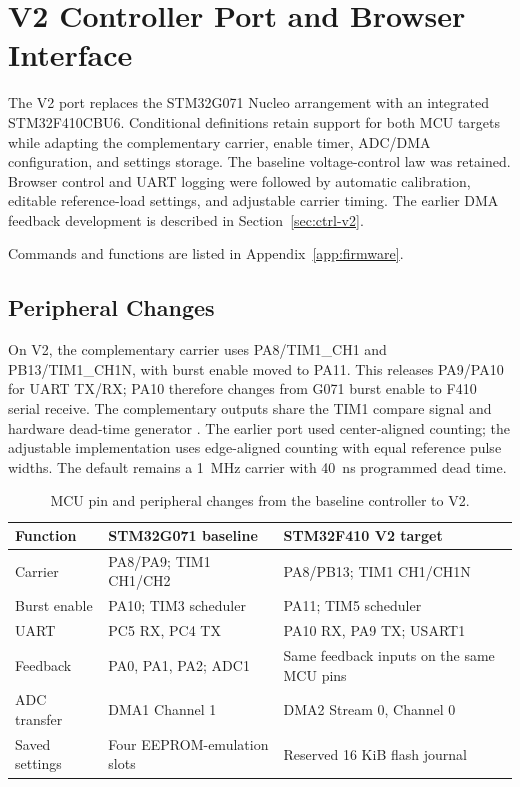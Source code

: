 \section{V2 Controller Port and Browser Interface}
\label{sec:ctrl-pwr2-port}

The V2 port replaces the STM32G071 Nucleo arrangement with an integrated STM32F410CBU6. Conditional definitions retain support for both MCU targets while adapting the complementary carrier, enable timer, ADC/DMA configuration, and settings storage. The baseline voltage-control law was retained. Browser control and UART logging were followed by automatic calibration, editable reference-load settings, and adjustable carrier timing. The earlier DMA feedback development is described in Section~\ref{sec:ctrl-v2}.

Commands and functions are listed in Appendix~\ref{app:firmware}.

\subsection{Peripheral Changes}

On V2, the complementary carrier uses PA8/TIM1\_CH1 and PB13/TIM1\_CH1N, with burst enable moved to PA11. This releases PA9/PA10 for UART TX/RX; PA10 therefore changes from G071 burst enable to F410 serial receive. The complementary outputs share the TIM1 compare signal and hardware dead-time generator \cite{ststm32f410ds,ststm32f410rm}. The earlier port used center-aligned counting; the adjustable implementation uses edge-aligned counting with equal reference pulse widths. The default remains a \SI{1}{\mega\hertz} carrier with \SI{40}{\nano\second} programmed dead time.

\begin{table}[htbp]
\centering
\caption{MCU pin and peripheral changes from the baseline controller to V2.}
\label{tab:ctrl-pwr2-port}
\small
\begin{tabularx}{\textwidth}{@{}L{0.23\textwidth}L{0.31\textwidth}Y@{}}
\toprule
Function & STM32G071 baseline & STM32F410 V2 target\\
\midrule
Carrier & PA8/PA9; TIM1 CH1/CH2 & PA8/PB13; TIM1 CH1/CH1N\\
Burst enable & PA10; TIM3 scheduler & PA11; TIM5 scheduler\\
UART & PC5 RX, PC4 TX & PA10 RX, PA9 TX; USART1\\
Feedback & PA0, PA1, PA2; ADC1 & Same feedback inputs on the same MCU pins\\
ADC transfer & DMA1 Channel 1 & DMA2 Stream 0, Channel 0\\
Saved settings & Four EEPROM-emulation slots & Reserved 16 KiB flash journal\\
\bottomrule
\end{tabularx}
\end{table}

